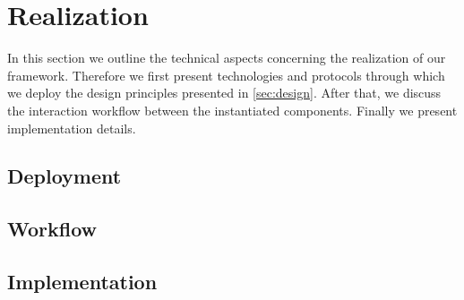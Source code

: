 \section{Realization}
In this section we outline the technical aspects concerning the realization of our framework. Therefore we first present technologies and protocols through which we deploy the design principles presented in \cref{sec:design}. After that, we discuss the interaction workflow between the instantiated components. Finally we present implementation details.
\subsection{Deployment}
\subsection{Workflow}
\subsection{Implementation}
